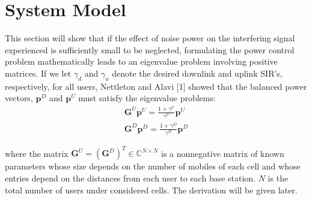 \documentclass[conference]{IEEEtran}
\begin{document}
\section{System Model}
This section will show that if the effect of noise power on the interfering signal experienced is sufficiently small to be neglected, formulating the power control problem mathematically leads to an eigenvalue problem involving positive matrices. If we let $\gamma_d$ and $\gamma_u$ denote the desired downlink and uplink SIR’s, respectively, for all users, Nettleton and Alavi [1] showed that the balanced power vectors, $\bm{p}^D$ and $\bm{p}^U$ must satisfy the eigenvalue problems:
\begin{align}
\bm{G}^U \bm{p}^U = \frac{1+\gamma^U}{\gamma^U}\bm{p}^U \\
 \bm{G}^D \bm{p}^D = \frac{1+\gamma^D}{\gamma^D}\bm{p}^D
\end{align}



where the matrix $\bm{G}^U = (\bm{G}^D)^T\in \mathbb{C}^{N\times N}$ is a nonnegative matrix of known parameters whose size depends on the number of mobiles of each cell and whose entries depend on the distances from each user to each base station. $N$ is the total number of users under considered cells. The derivation will be given later.
\end{document}
